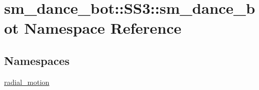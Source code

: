 \hypertarget{namespacesm__dance__bot_1_1SS3_1_1sm__dance__bot}{}\section{sm\+\_\+dance\+\_\+bot\+:\+:S\+S3\+:\+:sm\+\_\+dance\+\_\+bot Namespace Reference}
\label{namespacesm__dance__bot_1_1SS3_1_1sm__dance__bot}
\subsection*{Namespaces}
\begin{DoxyCompactItemize}
\item 
 \hyperlink{namespacesm__dance__bot_1_1SS3_1_1sm__dance__bot_1_1radial__motion}{radial\+\_\+motion}
\end{DoxyCompactItemize}
